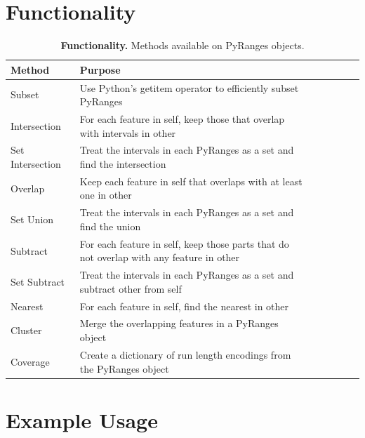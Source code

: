 \documentclass[10pt,letterpaper]{article}
\begin{document}
\pagebreak
\section*{Functionality}

\begin{table}[!ht]
\begin{adjustwidth}{-1.5in}{0in}
\centering
\caption{{\bf Functionality.} Methods available on PyRanges objects.}
\begin{tabular}{|l|l|l|l|l|l|l|}
\hline
  {\bf Method} & {\bf Purpose} \\ \hline
  Subset & Use Python's getitem operator to efficiently subset PyRanges \\ \hline
  Intersection & For each feature in self, keep those that overlap with intervals in other \footnotemark \\ \hline
  Set Intersection & Treat the intervals in each PyRanges as a set and find the intersection \footnotemark \\ \hline
  Overlap & Keep each feature in self that overlaps with at least one in other \\ \hline
  Set Union & Treat the intervals in each PyRanges as a set and find the union \\ \hline
  Subtract & For each feature in self, keep those parts that do not overlap with any feature in other \\ \hline
  Set Subtract & Treat the intervals in each PyRanges as a set and subtract other from self \\ \hline
  Nearest & For each feature in self, find the nearest in other \\ \hline
  Cluster & Merge the overlapping features in a PyRanges object \\ \hline
  Coverage & Create a dictionary of run length encodings from the PyRanges object \\ \hline
\end{tabular}
\label{tab1}
\end{adjustwidth}
\end{table}


\section*{Example Usage}
\end{document}
